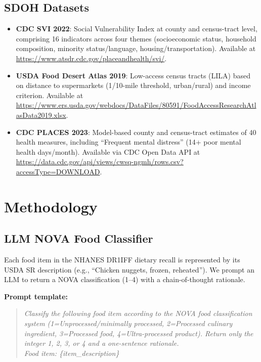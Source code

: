 \documentclass[journal]{IEEEtran}
\begin{document}
\subsection{SDOH Datasets}

\begin{itemize}
  \item \textbf{CDC SVI 2022}: Social Vulnerability Index at county and census-tract level, comprising 16 indicators across four themes (socioeconomic status, household composition, minority status/language, housing/transportation). Available at \url{https://www.atsdr.cdc.gov/placeandhealth/svi/}.

  \item \textbf{USDA Food Desert Atlas 2019}: Low-access census tracts (LILA) based on distance to supermarkets (1/10-mile threshold, urban/rural) and income criterion. Available at \url{https://www.ers.usda.gov/webdocs/DataFiles/80591/FoodAccessResearchAtlasData2019.xlsx}.

  \item \textbf{CDC PLACES 2023}: Model-based county and census-tract estimates of 40 health measures, including ``Frequent mental distress'' (14+ poor mental health days/month). Available via CDC Open Data API at \url{https://data.cdc.gov/api/views/cwsq-ngmh/rows.csv?accessType=DOWNLOAD}.
\end{itemize}

\section{Methodology}
\label{sec:methods}

\subsection{LLM NOVA Food Classifier}
\label{sec:nova}

Each food item in the NHANES DR1IFF dietary recall is represented by its USDA
SR description (e.g., ``Chicken nuggets, frozen, reheated''). We prompt an LLM
to return a NOVA classification (1--4) with a chain-of-thought rationale.

\textbf{Prompt template:}
\begin{quote}
\textit{Classify the following food item according to the NOVA food classification
system (1=Unprocessed/minimally processed, 2=Processed culinary ingredient,
3=Processed food, 4=Ultra-processed product). Return only the integer
1, 2, 3, or 4 and a one-sentence rationale.\\
Food item: \{item\_description\}}
\end{quote}
\end{document}
